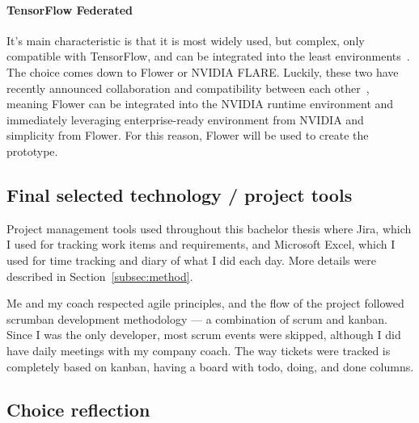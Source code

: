\paragraph{TensorFlow Federated} It's main characteristic is that it is most widely used, but complex, only compatible with TensorFlow, and can be integrated into the least environments~\cite{mehdiComprehensiveReviewOpenSource2025, yurdemFederatedLearningOverview2024}. \\

\noindent
The choice comes down to Flower or NVIDIA FLARE. Luckily, these two have recently announced collaboration and compatibility between each other~\cite{rothSuperchargingFederatedLearning2024, saysSuperchargingFederatedLearning2025, laneAnnouncingNVIDIAFlower2024a}, meaning Flower can be integrated into the NVIDIA runtime environment and immediately leveraging enterprise-ready environment from NVIDIA and simplicity from Flower. For this reason, Flower will be used to create the prototype.


\subsection{Final selected technology / project tools}

Project management tools used throughout this bachelor thesis where Jira, which I used for tracking work items and requirements, and Microsoft Excel, which I used for time tracking and diary of what I did each day. More details were described in Section~\ref{subsec:method}.

Me and my coach respected agile principles, and the flow of the project followed scrumban development methodology --- a combination of scrum and kanban. Since I was the only developer, most scrum events were skipped, although I did have daily meetings with my company coach. The way tickets were tracked is completely based on kanban, having a board with todo, doing, and done columns.


\subsection{Choice reflection}


